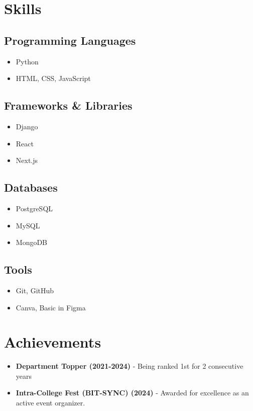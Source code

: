 \documentclass[11pt]{article}
\begin{document}
\section{Skills}
\subsection{Programming Languages}
\begin{itemize}
    \item Python
    \item HTML, CSS, JavaScript
\end{itemize}

\subsection{Frameworks \& Libraries}
\begin{itemize}
    \item Django
    \item React
    \item Next.js
\end{itemize}

\subsection{Databases}
\begin{itemize}
    \item PostgreSQL
    \item MySQL
    \item MongoDB
\end{itemize}

\subsection{Tools}
\begin{itemize}
    \item Git, GitHub
    \item Canva, Basic in Figma
\end{itemize}

\section{Achievements}
\begin{itemize}
    \item[\faCertificate] \textbf{Department Topper (2021-2024)} - Being ranked 1st for 2 consecutive years
    \item[\faTrophy] \textbf{Intra-College Fest (BIT-SYNC) (2024)} - Awarded for excellence as an active event organizer.
\end{itemize}
\end{document}
